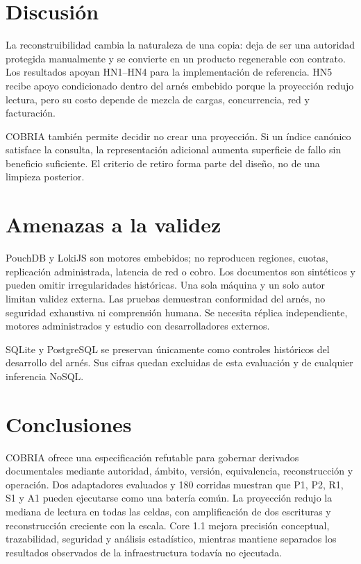\documentclass[11pt]{article}
\begin{document}
\section{Discusión}
La reconstruibilidad cambia la naturaleza de una copia: deja de ser una autoridad protegida manualmente y se convierte en un producto regenerable con contrato. Los resultados apoyan HN1--HN4 para la implementación de referencia. HN5 recibe apoyo condicionado dentro del arnés embebido porque la proyección redujo lectura, pero su costo depende de mezcla de cargas, concurrencia, red y facturación.

COBRIA también permite decidir no crear una proyección. Si un índice canónico satisface la consulta, la representación adicional aumenta superficie de fallo sin beneficio suficiente. El criterio de retiro forma parte del diseño, no de una limpieza posterior.

\section{Amenazas a la validez}
PouchDB y LokiJS son motores embebidos; no reproducen regiones, cuotas, replicación administrada, latencia de red o cobro. Los documentos son sintéticos y pueden omitir irregularidades históricas. Una sola máquina y un solo autor limitan validez externa. Las pruebas demuestran conformidad del arnés, no seguridad exhaustiva ni comprensión humana. Se necesita réplica independiente, motores administrados y estudio con desarrolladores externos.

SQLite y PostgreSQL se preservan únicamente como controles históricos del desarrollo del arnés. Sus cifras quedan excluidas de esta evaluación y de cualquier inferencia NoSQL.

\section{Conclusiones}
COBRIA ofrece una especificación refutable para gobernar derivados documentales mediante autoridad, ámbito, versión, equivalencia, reconstrucción y operación. Dos adaptadores evaluados y 180 corridas muestran que P1, P2, R1, S1 y A1 pueden ejecutarse como una batería común. La proyección redujo la mediana de lectura en todas las celdas, con amplificación de dos escrituras y reconstrucción creciente con la escala. Core 1.1 mejora precisión conceptual, trazabilidad, seguridad y análisis estadístico, mientras mantiene separados los resultados observados de la infraestructura todavía no ejecutada.
\end{document}
